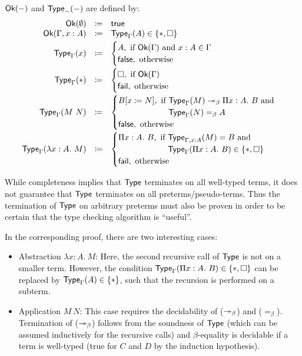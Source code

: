 $\textsf{Ok}(-)$ and $\textsf{Type}_-(-)$ are defined by:
\[
\begin{array}{rcl}
    \Ok(\emptyset) & \ceq & \textsf{true} \\
    \Ok(\Gamma, x : A) & \ceq & \Type_\Gamma(A) \in \{ \ast, \square \} \\[1mm]
    \Type_\Gamma(x) & \ceq & \begin{cases}
        A,\ \text{if}\ \Ok(\Gamma)\ \text{and}\ x : A \in \Gamma \\
        \textsf{false},\ \text{otherwise}
    \end{cases} \brbr
    \Type_\Gamma(\ast) & \ceq & \begin{cases}
        \square,\ \text{if}\ \Ok(\Gamma) \\
        \textsf{fail},\ \text{otherwise}
    \end{cases} \brbr
    \Type_\Gamma(M\ N) & \ceq & \begin{cases}
        B[x \ceq N],\ \text{if}\ \Type_\Gamma(M) \eval_\beta \Pi x:A.\ B\ \text{and} \\
        \hphantom{B[x \ceq N],\ \text{if}\ }
        \Type_\Gamma(N) =_\beta A \\
        \textsf{false},\ \text{otherwise}
    \end{cases} \\[6mm]
    \Type_\Gamma(\lambda x : A.\ M) & \ceq & \begin{cases}
        \Pi x : A.\ B,\ \text{if}\ \Type_{\Gamma, x : A}(M) = B\ \text{and} \\
        \hphantom{\Pi x : A.\ B,\ \text{if}\ }
        \Type_\Gamma(\Pi x : A.\ B) \in \{ \ast, \square \} \\
        \textsf{fail},\ \text{otherwise}
    \end{cases}
\end{array}
\]

While completeness implies that $\textsf{Type}$ terminates on all well-typed
terms, it does not guarantee that $\textsf{Type}$ terminates on all
preterms/pseudo-terms.
Thus the termination of $\textsf{Type}$ on arbitrary preterms must also be proven
in order to be certain that the type checking algorithm is ``useful''.

In the corresponding proof, there are two interesting cases:
\begin{itemize}
    \item Abstraction $\lambda x : A.\ M$:
          Here, the second recursive call of $\textsf{Type}$ is not on a smaller term.
          However, the condition $\textsf{Type}_\Gamma(\Pi x : A.\ B) \in \{ \ast, \square \}$
          can be replaced by $\textsf{Type}_\Gamma(A) \in \{ \ast \}$, such that
          the recursion is performed on a subterm.
    \item Application $M\ N$: This case requires the decidability of
          ($\twoheadrightarrow_\beta$) and ($=_\beta$).
          Termination of ($\twoheadrightarrow_\beta$) follows from the soundness of $\textsf{Type}$
          (which can be assumed inductively for the recursive calls)
          and $\beta$-equality is decidable if a term is well-typed
          (true for $C$ and $D$ by the induction hypothesis).
\end{itemize}
